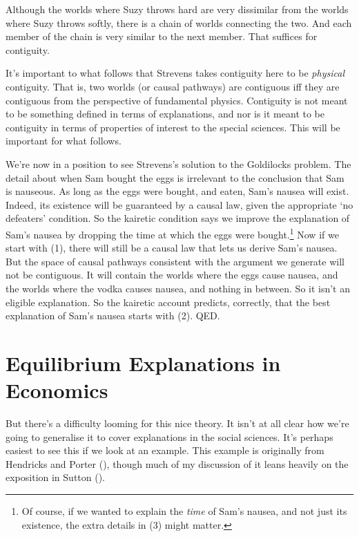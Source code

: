 \documentclass[
  11pt,
  letterpaper,
  DIV=11,
  numbers=noendperiod,
  twoside]{scrartcl}
\begin{document}
Although the worlds where Suzy throws hard are very dissimilar from the
worlds where Suzy throws softly, there is a chain of worlds connecting
the two. And each member of the chain is very similar to the next
member. That suffices for contiguity.

It's important to what follows that Strevens takes contiguity here to be
\emph{physical} contiguity. That is, two worlds (or causal pathways) are
contiguous iff they are contiguous from the perspective of fundamental
physics. Contiguity is not meant to be something defined in terms of
explanations, and nor is it meant to be contiguity in terms of
properties of interest to the special sciences. This will be important
for what follows.

We're now in a position to see Strevens's solution to the Goldilocks
problem. The detail about when Sam bought the eggs is irrelevant to the
conclusion that Sam is nauseous. As long as the eggs were bought, and
eaten, Sam's nausea will exist. Indeed, its existence will be guaranteed
by a causal law, given the appropriate `no defeaters' condition. So the
kairetic condition says we improve the explanation of Sam's nausea by
dropping the time at which the eggs were bought.\footnote{Of course, if
  we wanted to explain the \emph{time} of Sam's nausea, and not just its
  existence, the extra details in (3) might matter.} Now if we start
with (1), there will still be a causal law that lets us derive Sam's
nausea. But the space of causal pathways consistent with the argument we
generate will not be contiguous. It will contain the worlds where the
eggs cause nausea, and the worlds where the vodka causes nausea, and
nothing in between. So it isn't an eligible explanation. So the kairetic
account predicts, correctly, that the best explanation of Sam's nausea
starts with (2). QED.

\section{Equilibrium Explanations in
Economics}\label{equilibrium-explanations-in-economics}

But there's a difficulty looming for this nice theory. It isn't at all
clear how we're going to generalise it to cover explanations in the
social sciences. It's perhaps easiest to see this if we look at an
example. This example is originally from Hendricks and Porter
(), though much of my discussion
of it leans heavily on the exposition in Sutton
().
\end{document}
